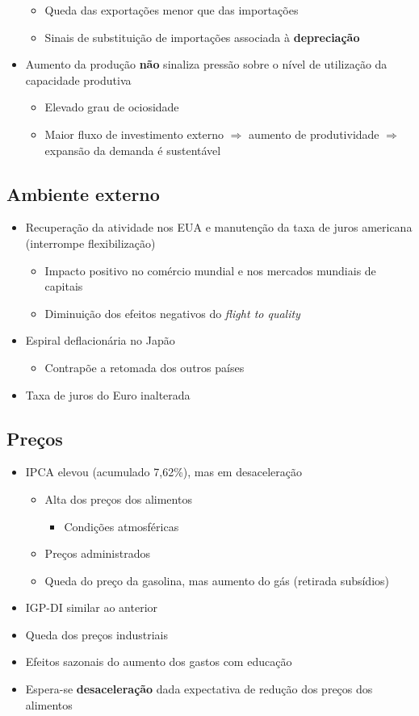 \documentclass[11pt]{article}
\begin{document}
\begin{itemize}
\begin{itemize}
\item Queda das exportações menor que das importações
\item Sinais de substituição de importações associada à \textbf{depreciação}
\end{itemize}
\item Aumento da produção \textbf{não} sinaliza pressão sobre o nível de utilização da capacidade produtiva
\begin{itemize}
\item Elevado grau de ociosidade
\item Maior fluxo de investimento externo \(\Rightarrow\) aumento de produtividade \(\Rightarrow\) expansão da demanda é sustentável
\end{itemize}
\end{itemize}
\subsection*{Ambiente externo}
\label{sec:org970a6d4}
\begin{itemize}
\item Recuperação da atividade nos EUA e manutenção da taxa de juros americana (interrompe flexibilização)
\begin{itemize}
\item Impacto positivo no comércio mundial e nos mercados mundiais de capitais
\item Diminuição dos efeitos negativos do \emph{flight to quality}
\end{itemize}
\item Espiral deflacionária no Japão
\begin{itemize}
\item Contrapõe a retomada dos outros países
\end{itemize}
\item Taxa de juros do Euro inalterada
\end{itemize}
\subsection*{Preços}
\label{sec:orgc1e9557}
\begin{itemize}
\item IPCA elevou (acumulado 7,62\%), mas em desaceleração
\begin{itemize}
\item Alta dos preços dos alimentos
\begin{itemize}
\item Condições atmosféricas
\end{itemize}
\item Preços administrados
\item Queda do preço da gasolina, mas aumento do gás (retirada subsídios)
\end{itemize}
\item IGP-DI similar ao anterior
\item Queda dos preços industriais
\item Efeitos sazonais do aumento dos gastos com educação
\item Espera-se \textbf{desaceleração} dada expectativa de redução dos preços dos alimentos
\end{itemize}
\end{document}

